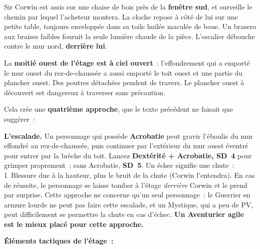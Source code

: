 \documentclass[10pt,a4paper]{article}
\begin{document}
Sir Corwin est assis sur une chaise de bois près de la \textbf{fenêtre sud}, et surveille le chemin par lequel l’acheteur montera. La cloche repose à côté de lui sur une petite table, toujours enveloppée dans sa toile huilée maculée de boue. Un brasero aux braises faibles fournit la seule lumière chaude de la pièce. L’escalier débouche contre le mur nord, \textbf{derrière lui}.

La \textbf{moitié ouest de l’étage est à ciel ouvert}~: l’effondrement qui a emporté le mur ouest du rez-de-chaussée a aussi emporté le toit ouest et une partie du plancher ouest. Des poutres détachées pendent de travers. Le plancher ouest à découvert est dangereux à traverser sans précaution.

Cela crée une \textbf{quatrième approche}, que le texte précédent ne faisait que suggérer~:

\textbf{L’escalade.} Un personnage qui possède \textbf{Acrobatie} peut gravir l’éboulis du mur effondré au rez-de-chaussée, puis continuer par l’extérieur du mur ouest éventré pour entrer par la brèche du toit. Lancez \textbf{Dextérité + Acrobatie, SD~4} pour grimper proprement~; sans Acrobatie, \textbf{SD~5}. Un échec signifie une chute~: 1~Blessure due à la hauteur, plus le bruit de la chute (Corwin l’entendra). En cas de réussite, le personnage se laisse tomber à l’étage \emph{derrière} Corwin et le prend par surprise. Cette approche ne concerne qu’un seul personnage~: le Guerrier en armure lourde ne peut pas faire cette escalade, et un Mystique, qui a peu de PV, peut difficilement se permettre la chute en cas d’échec. \textbf{Un Aventurier agile est le mieux placé pour cette approche.}

\par{}\noindent\textbf{Éléments tactiques de l’étage~:}
\end{document}
